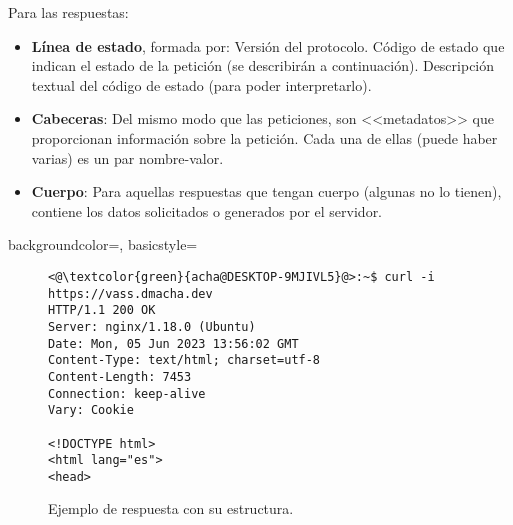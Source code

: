 Para las respuestas:
\begin{itemize}
	\item \textbf{Línea de estado}, formada por:
  \subitem Versión del protocolo.
  \subitem Código de estado que indican el estado de la petición (se describirán a continuación).
  \subitem Descripción textual del código de estado (para poder interpretarlo).
	\item \textbf{Cabeceras}: Del mismo modo que las peticiones, son <<metadatos>> que
  proporcionan información sobre la petición. Cada una de ellas (puede haber
  varias) es un par nombre-valor.
  \item \textbf{Cuerpo}: Para aquellas respuestas que tengan cuerpo (algunas no lo tienen),
  contiene los datos solicitados o generados por el servidor.
\end{itemize}

{
    backgroundcolor=\color{black},
    basicstyle=\scriptsize\color{white}\ttfamily
}

\begin{figure}[H]
\begin{lstlisting}[style=bash]
<@\textcolor{green}{acha@DESKTOP-9MJIVL5}@>:~$ curl -i https://vass.dmacha.dev
HTTP/1.1 200 OK
Server: nginx/1.18.0 (Ubuntu)
Date: Mon, 05 Jun 2023 13:56:02 GMT
Content-Type: text/html; charset=utf-8
Content-Length: 7453
Connection: keep-alive
Vary: Cookie

<!DOCTYPE html>
<html lang="es">
<head>
\end{lstlisting}
\caption{Ejemplo de respuesta con su estructura.}
\end{figure}

